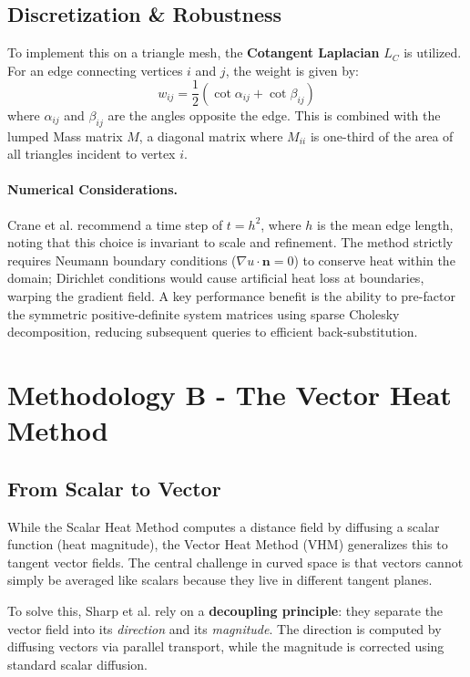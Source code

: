 \documentclass[11pt,a4paper]{article}
\begin{document}
\subsection{Discretization \& Robustness}
To implement this on a triangle mesh, the \textbf{Cotangent Laplacian} $L_C$ is utilized. For an edge connecting vertices $i$ and $j$, the weight is given by:
\begin{equation}
    w_{ij} = \frac{1}{2} (\cot \alpha_{ij} + \cot \beta_{ij})
\end{equation}
where $\alpha_{ij}$ and $\beta_{ij}$ are the angles opposite the edge. This is combined with the lumped Mass matrix $M$, a diagonal matrix where $M_{ii}$ is one-third of the area of all triangles incident to vertex $i$.

\paragraph{Numerical Considerations.}
Crane et al. recommend a time step of $t = h^2$, where $h$ is the mean edge length, noting that this choice is invariant to scale and refinement. The method strictly requires Neumann boundary conditions ($\nabla u \cdot \mathbf{n} = 0$) to conserve heat within the domain; Dirichlet conditions would cause artificial heat loss at boundaries, warping the gradient field. A key performance benefit is the ability to pre-factor the symmetric positive-definite system matrices using sparse Cholesky decomposition, reducing subsequent queries to efficient back-substitution.

\section{Methodology B - The Vector Heat Method}

\subsection{From Scalar to Vector}

While the Scalar Heat Method computes a distance field by diffusing a scalar function (heat magnitude), the Vector Heat Method (VHM) generalizes this to tangent vector fields. The central challenge in curved space is that vectors cannot simply be averaged like scalars because they live in different tangent planes.

To solve this, Sharp et al. rely on a \textbf{decoupling principle}: they separate the vector field into its \textit{direction} and its \textit{magnitude}. The direction is computed by diffusing vectors via parallel transport, while the magnitude is corrected using standard scalar diffusion.
\end{document}
